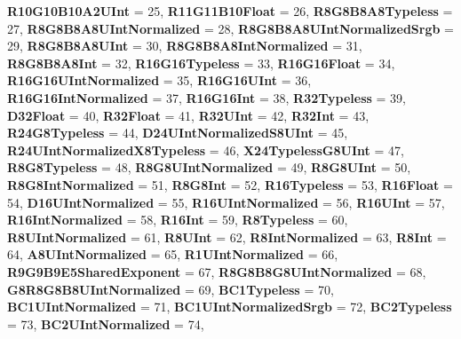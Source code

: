 \begin{DoxyCompactItemize}
{\bfseries R10\+G10\+B10\+A2\+U\+Int} = 25, 
{\bfseries R11\+G11\+B10\+Float} = 26, 
{\bfseries R8\+G8\+B8\+A8\+Typeless} = 27, 
\newline
{\bfseries R8\+G8\+B8\+A8\+U\+Int\+Normalized} = 28, 
{\bfseries R8\+G8\+B8\+A8\+U\+Int\+Normalized\+Srgb} = 29, 
{\bfseries R8\+G8\+B8\+A8\+U\+Int} = 30, 
{\bfseries R8\+G8\+B8\+A8\+Int\+Normalized} = 31, 
\newline
{\bfseries R8\+G8\+B8\+A8\+Int} = 32, 
{\bfseries R16\+G16\+Typeless} = 33, 
{\bfseries R16\+G16\+Float} = 34, 
{\bfseries R16\+G16\+U\+Int\+Normalized} = 35, 
\newline
{\bfseries R16\+G16\+U\+Int} = 36, 
{\bfseries R16\+G16\+Int\+Normalized} = 37, 
{\bfseries R16\+G16\+Int} = 38, 
{\bfseries R32\+Typeless} = 39, 
\newline
{\bfseries D32\+Float} = 40, 
{\bfseries R32\+Float} = 41, 
{\bfseries R32\+U\+Int} = 42, 
{\bfseries R32\+Int} = 43, 
\newline
{\bfseries R24\+G8\+Typeless} = 44, 
{\bfseries D24\+U\+Int\+Normalized\+S8\+U\+Int} = 45, 
{\bfseries R24\+U\+Int\+Normalized\+X8\+Typeless} = 46, 
{\bfseries X24\+Typeless\+G8\+U\+Int} = 47, 
\newline
{\bfseries R8\+G8\+Typeless} = 48, 
{\bfseries R8\+G8\+U\+Int\+Normalized} = 49, 
{\bfseries R8\+G8\+U\+Int} = 50, 
{\bfseries R8\+G8\+Int\+Normalized} = 51, 
\newline
{\bfseries R8\+G8\+Int} = 52, 
{\bfseries R16\+Typeless} = 53, 
{\bfseries R16\+Float} = 54, 
{\bfseries D16\+U\+Int\+Normalized} = 55, 
\newline
{\bfseries R16\+U\+Int\+Normalized} = 56, 
{\bfseries R16\+U\+Int} = 57, 
{\bfseries R16\+Int\+Normalized} = 58, 
{\bfseries R16\+Int} = 59, 
\newline
{\bfseries R8\+Typeless} = 60, 
{\bfseries R8\+U\+Int\+Normalized} = 61, 
{\bfseries R8\+U\+Int} = 62, 
{\bfseries R8\+Int\+Normalized} = 63, 
\newline
{\bfseries R8\+Int} = 64, 
{\bfseries A8\+U\+Int\+Normalized} = 65, 
{\bfseries R1\+U\+Int\+Normalized} = 66, 
{\bfseries R9\+G9\+B9\+E5\+Shared\+Exponent} = 67, 
\newline
{\bfseries R8\+G8\+B8\+G8\+U\+Int\+Normalized} = 68, 
{\bfseries G8\+R8\+G8\+B8\+U\+Int\+Normalized} = 69, 
{\bfseries B\+C1\+Typeless} = 70, 
{\bfseries B\+C1\+U\+Int\+Normalized} = 71, 
\newline
{\bfseries B\+C1\+U\+Int\+Normalized\+Srgb} = 72, 
{\bfseries B\+C2\+Typeless} = 73, 
{\bfseries B\+C2\+U\+Int\+Normalized} = 74, 

\end{DoxyCompactItemize}
